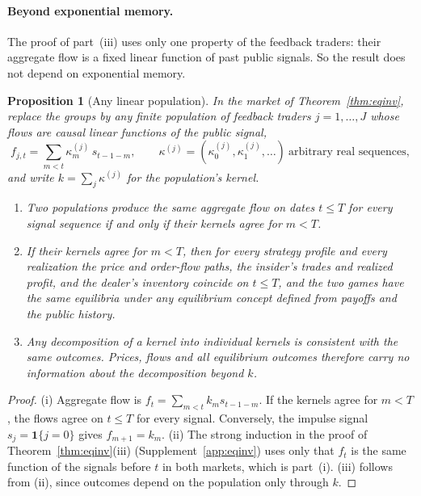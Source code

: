 \documentclass[12pt]{article}
\newtheorem{proposition}[theorem]{Proposition}
\theoremstyle{definition}
\theoremstyle{remark}
\begin{document}
\paragraph{Beyond exponential memory.} The proof of part~(iii) uses only one property of the feedback traders: their aggregate flow is a fixed linear function of past public signals. So the result does not depend on exponential memory.

\begin{proposition}[Any linear population]\label{prop:anylinear}
In the market of Theorem~\ref{thm:eqinv}, replace the groups by any finite population of feedback traders $j=1,\ldots,J$ whose flows are causal linear functions of the public signal,
\[
 f_{j,t}=\sum_{m<t}\kappa^{(j)}_m\,s_{t-1-m},\qquad \kappa^{(j)}=(\kappa^{(j)}_0,\kappa^{(j)}_1,\ldots)\ \text{arbitrary real sequences},
\]
and write $k=\sum_j\kappa^{(j)}$ for the population's kernel.
\begin{enumerate}[label=(\roman*),itemsep=1pt]
\item Two populations produce the same aggregate flow on dates $t\le T$ for every signal sequence if and only if their kernels agree for $m<T$.
\item If their kernels agree for $m<T$, then for every strategy profile and every realization the price and order-flow paths, the insider's trades and realized profit, and the dealer's inventory coincide on $t\le T$, and the two games have the same equilibria under any equilibrium concept defined from payoffs and the public history.
\item Any decomposition of a kernel into individual kernels is consistent with the same outcomes. Prices, flows and all equilibrium outcomes therefore carry no information about the decomposition beyond $k$.
\end{enumerate}
\end{proposition}

\begin{proof}
(i) Aggregate flow is $f_t=\sum_{m<t}k_ms_{t-1-m}$. If the kernels agree for $m<T$, the flows agree on $t\le T$ for every signal. Conversely, the impulse signal $s_j=\mathbf 1\{j=0\}$ gives $f_{m+1}=k_m$. (ii) The strong induction in the proof of Theorem~\ref{thm:eqinv}(iii) (Supplement~\ref{app:eqinv}) uses only that $f_t$ is the same function of the signals before $t$ in both markets, which is part~(i). (iii) follows from (ii), since outcomes depend on the population only through $k$.
\end{proof}
\end{document}
